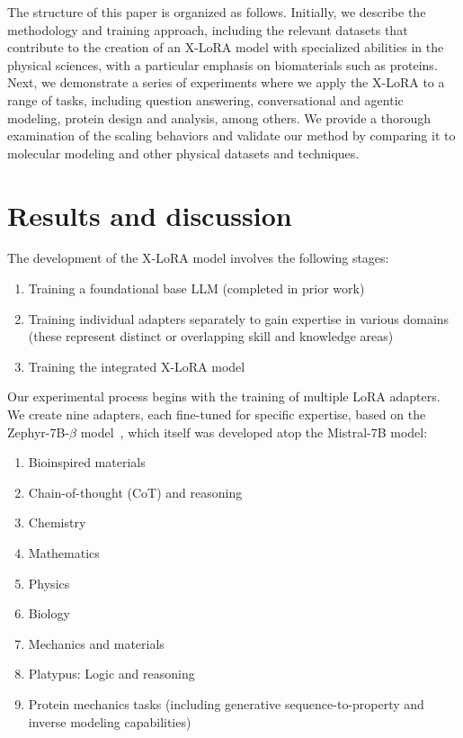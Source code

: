 The structure of this paper is organized as follows. Initially, we describe the methodology and training approach, including the relevant datasets that contribute to the creation of an X-LoRA model with specialized abilities in the physical sciences, with a particular emphasis on biomaterials such as proteins. Next, we demonstrate a series of experiments where we apply the X-LoRA to a range of tasks, including question answering, conversational and agentic modeling, protein design and analysis, among others. We provide a thorough examination of the scaling behaviors and validate our method by comparing it to molecular modeling and other physical datasets and techniques.

\section{Results and discussion}

The development of the X-LoRA model involves the following stages:

\begin{enumerate}
    \item Training a foundational base LLM (completed in prior work) \item Training individual adapters separately to gain expertise in various domains (these represent distinct or overlapping skill and knowledge areas) \item Training the integrated X-LoRA model
\end{enumerate}

Our experimental process begins with the training of multiple LoRA adapters. We create nine adapters, each fine-tuned for specific expertise, based on the Zephyr-7B-$\beta$ model~\cite{HuggingFaceH4/zephyr-7b-betaFace}, which itself was developed atop the Mistral-7B model\cite{Jiang2023Mistral7B}:

\begin{enumerate}
    \item Bioinspired materials \item Chain-of-thought (CoT) and reasoning \item Chemistry \item Mathematics \item Physics \item Biology \item Mechanics and materials \item Platypus: Logic and reasoning \item Protein mechanics tasks (including generative sequence-to-property and inverse modeling capabilities)
\end{enumerate}

